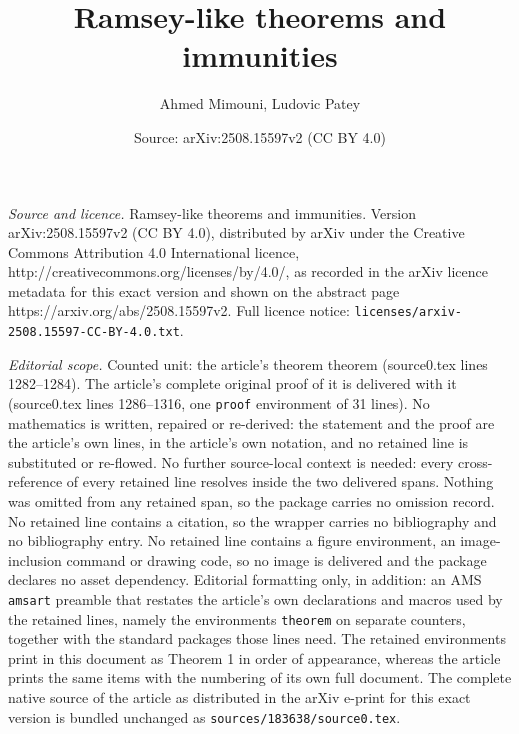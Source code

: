 \documentclass[10pt,a4paper]{amsart}
\title{Ramsey-like theorems and immunities}
\author{Ahmed Mimouni, Ludovic Patey}
\date{Source: arXiv:2508.15597v2 (CC BY 4.0)}
\newtheorem{theorem}{Theorem}
\def\Hc{\mathcal{H}}
\newcommand{\NN}[0]{\mathbb{N}}
\begin{document}
\maketitle

\noindent\emph{Source and licence.} Ramsey-like theorems and immunities. Version arXiv:2508.15597v2 (CC BY 4.0), distributed by arXiv under the Creative Commons Attribution 4.0 International licence, http://creativecommons.org/licenses/by/4.0/, as recorded in the arXiv licence metadata for this exact version and shown on the abstract page https://arxiv.org/abs/2508.15597v2. Full licence notice: \texttt{licenses/arxiv-2508.15597-CC-BY-4.0.txt}.\par\smallskip

\noindent\textit{Editorial scope.} Counted unit: the article's theorem theorem (source0.tex lines 1282--1284). The article's complete original proof of it is delivered with it (source0.tex lines 1286--1316, one \texttt{proof} environment of 31 lines). No mathematics is written, repaired or re-derived: the statement and the proof are the article's own lines, in the article's own notation, and no retained line is substituted or re-flowed.  No further source-local context is needed: every cross-reference of every retained line resolves inside the two delivered spans.  Nothing was omitted from any retained span, so the package carries no omission record.  No retained line contains a citation, so the wrapper carries no bibliography and no bibliography entry.  No retained line contains a figure environment, an image-inclusion command or drawing code, so no image is delivered and the package declares no asset dependency.  Editorial formatting only, in addition: an AMS \texttt{amsart} preamble that restates the article's own declarations and macros used by the retained lines, namely the environments \texttt{theorem} on separate counters, together with the standard packages those lines need.  The retained environments print in this document as Theorem 1 in order of appearance, whereas the article prints the same items with the numbering of its own full document.  The complete native source of the article as distributed in the arXiv e-print for this exact version is bundled unchanged as \texttt{sources/183638/source0.tex}.
\end{document}
